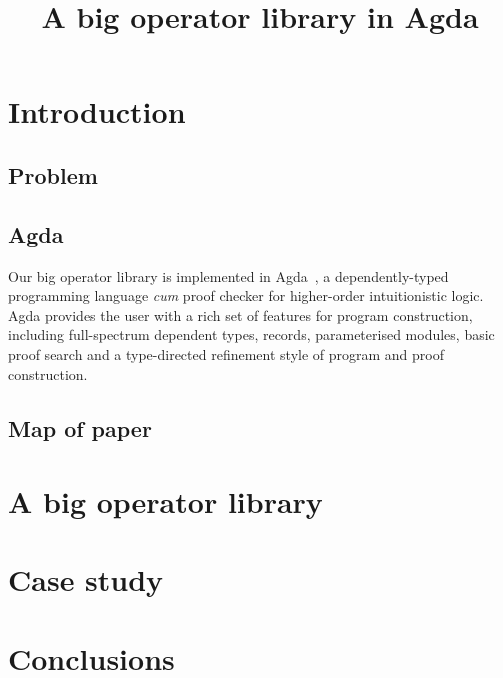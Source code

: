 \documentclass[preprint,natbib,10pt]{sigplanconf}
\title{A big operator library in Agda}
\begin{document}
\maketitle

\begin{abstract}
\end{abstract}

\section{Introduction}
\label{sect.introduction}

\subsection{Problem}
\label{subsect.problem}

\subsection{Agda}
\label{subsect.agda}

Our big operator library is implemented in Agda~\cite{norrell:agda:2008}, a dependently-typed programming language \emph{cum} proof checker for higher-order intuitionistic logic.
Agda provides the user with a rich set of features for program construction, including full-spectrum dependent types, records, parameterised modules, basic proof search and a type-directed refinement style of program and proof construction.

\subsection{Map of paper}
\label{subsect.map.of.paper}

\section{A big operator library}
\label{sect.big.operator.library}

\section{Case study}
\label{sect.case.study}

\section{Conclusions}
\label{sect.conclusions}


\end{document}
